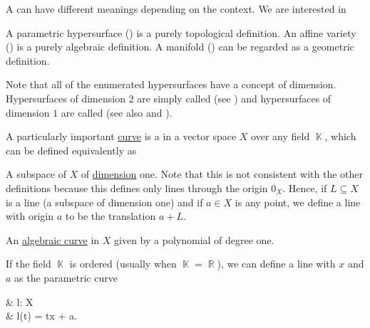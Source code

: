 \begin{definition}\label{def:hypersurface}
  A  can have different meanings depending on the context. We are interested in

  \begin{thmenum}
     A parametric hypersurface () is a purely topological definition.
     An affine variety () is a purely algebraic definition.
     A manifold () can be regarded as a geometric definition.
  \end{thmenum}

  Note that all of the enumerated hypersurfaces have a concept of dimension. Hypersurfaces of dimension \( 2 \) are simply called  (see ) and hypersurfaces of dimension \( 1 \) are called  (see also  and ).
\end{definition}

\begin{definition}\label{def:geometric_line}
  A particularly important \hyperref[def:hypersurface]{curve} is a  in a vector space \( X \) over any field \( \BbbK \), which can be defined equivalently as

  \begin{thmenum}
     A subspace of \( X \) of \hyperref[thm:vector_space_dimension]{dimension} one. Note that this is not consistent with the other definitions because this defines only lines through the origin \( 0_X \). Hence, if \( L \subseteq X \) is a line (a subspace of dimension one) and if \( a \in X \) is any point, we define a line with origin \( a \) to be the translation \( a + L \).

     An \hyperref[def:affine_algebraic_set/curve]{algebraic curve} in \( X \) given by a polynomial of degree one.

     If the field \( \BbbK \) is ordered (usually when \( \BbbK = \BbbR \)), we can define a line with  \( x \) and  \( a \) as the parametric curve
    \begin{balign*}
       & l: \BbbK \to X   \\
       & l(t) = tx + a.
    \end{balign*}
  \end{thmenum}
\end{definition}

